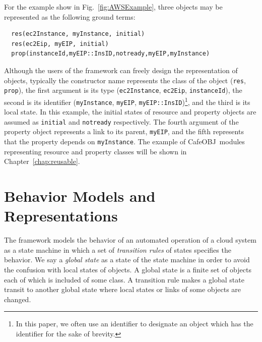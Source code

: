 \documentclass[12pt]{report}
\newcommand{\cafeobj}{{\sf CafeOBJ}~}
\begin{document}
For the example show in Fig.~\ref{fig:AWSExample}, three objects may
be represented as the following ground terms:
\begin{verbatim}
  res(ec2Instance, myInstance, initial)
  res(ec2Eip, myEIP, initial)
  prop(instanceId,myEIP::InsID,notready,myEIP,myInstance)
\end{verbatim}
Although the users of the framework can freely design the
representation of objects, typically the constructor name represents
the class of the object ({\tt res}, {\tt prop}), the first argument is
its type ({\tt ec2Instance}, {\tt ec2Eip}, {\tt instanceId}), the
second is its identifier ({\tt myInstance}, {\tt myEIP},
{\tt myEIP::InsID})\footnote{In this paper, we often use an identifier
  to designate an object which has the identifier for the sake of
  brevity.}, and the third is its local state. In this example, the
initial states of resource and property objects are assumed as
{\tt initial} and {\tt notready} respectively. The fourth argument of the
property object represents a link to its parent, {\tt myEIP}, and the
fifth represents that the property depends on {\tt myInstance}. The
example of \cafeobj modules representing resource and property classes
will be shown in Chapter~\ref{chap:reusable}.

\section{Behavior Models and Representations}
\label{sec:behaviormodel}
The framework models the behavior of an automated operation of a cloud
system as a state machine in which a set of {\it transition rules} of
states specifies the behavior. We say a {\it global state} as a state
of the state machine in order to avoid the confusion with local states
of objects. A global state is a finite set of objects each of which is
included of some class. A transition rule makes a global state transit
to another global state where local states or links of some objects
are changed.
\end{document}

